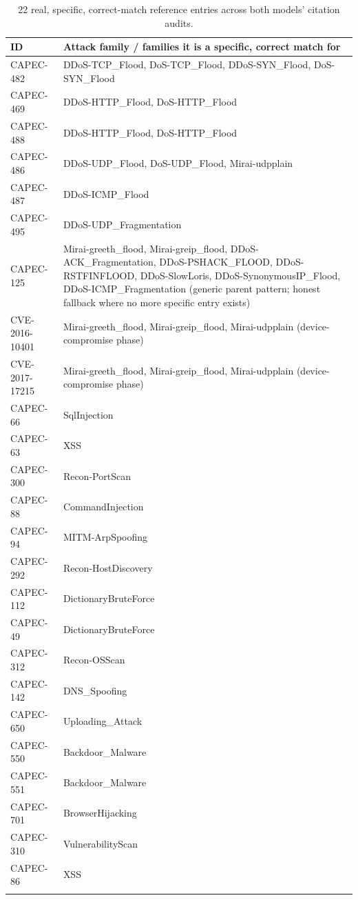 \documentclass[10pt,twocolumn]{article}
\begin{document}
\begin{longtable}{p{}p{}}
\toprule
ID & Attack family / families it is a specific, correct match for \\
\midrule
\endhead
CAPEC-482 & DDoS-TCP\_Flood, DoS-TCP\_Flood, DDoS-SYN\_Flood, DoS-SYN\_Flood \\
CAPEC-469 & DDoS-HTTP\_Flood, DoS-HTTP\_Flood \\
CAPEC-488 & DDoS-HTTP\_Flood, DoS-HTTP\_Flood \\
CAPEC-486 & DDoS-UDP\_Flood, DoS-UDP\_Flood, Mirai-udpplain \\
CAPEC-487 & DDoS-ICMP\_Flood \\
CAPEC-495 & DDoS-UDP\_Fragmentation \\
CAPEC-125 & Mirai-greeth\_flood, Mirai-greip\_flood, DDoS-ACK\_Fragmentation, DDoS-PSHACK\_FLOOD, DDoS-RSTFINFLOOD, DDoS-SlowLoris, DDoS-SynonymousIP\_Flood, DDoS-ICMP\_Fragmentation (generic parent pattern; honest fallback where no more specific entry exists) \\
CVE-2016-10401 & Mirai-greeth\_flood, Mirai-greip\_flood, Mirai-udpplain (device-compromise phase) \\
CVE-2017-17215 & Mirai-greeth\_flood, Mirai-greip\_flood, Mirai-udpplain (device-compromise phase) \\
CAPEC-66 & SqlInjection \\
CAPEC-63 & XSS \\
CAPEC-300 & Recon-PortScan \\
CAPEC-88 & CommandInjection \\
CAPEC-94 & MITM-ArpSpoofing \\
CAPEC-292 & Recon-HostDiscovery \\
CAPEC-112 & DictionaryBruteForce \\
CAPEC-49 & DictionaryBruteForce \\
CAPEC-312 & Recon-OSScan \\
CAPEC-142 & DNS\_Spoofing \\
CAPEC-650 & Uploading\_Attack \\
CAPEC-550 & Backdoor\_Malware \\
CAPEC-551 & Backdoor\_Malware \\
CAPEC-701 & BrowserHijacking \\
CAPEC-310 & VulnerabilityScan \\
CAPEC-86 & XSS \\
\bottomrule
\caption{22 real, specific, correct-match reference entries across both models' citation audits.}
\end{longtable}
\end{document}
